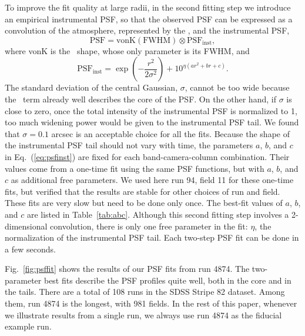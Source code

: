 To improve the fit quality at large radii, in the second fitting step we introduce an
empirical instrumental PSF, so that the observed PSF can be expressed as
a convolution of the atmosphere, represented by the \vk, and
the instrumental PSF,
\begin{equation}
        \textrm{PSF} = \textrm{vonK} (\textrm{FWHM}) \otimes \textrm{PSF}_{\textrm{inst}},
\end{equation} 
where vonK is the \vk~shape, whose only parameter is its FWHM, and
\begin{equation}
        \textrm{PSF}_{\textrm{inst}} = \exp(-\frac{r^2}{2\sigma^2}) + 10^{\eta(ar^2+br+c)}.
\label{eq:psfinst}
\end{equation} 
The standard deviation of the central Gaussian, $\sigma$, cannot be
too wide because the \vk~term already well describes the core of the PSF.
On the other hand, if $\sigma$ is close to zero, once the
total intensity of the instrumental PSF is normalized to 1, too much
widening power would be given to the instrumental PSF tail.
We found that $\sigma = 0.1$ arcsec is an acceptable choice for all the fits.
Because the shape of the instrumental PSF tail should not vary with
time, the parameters $a$, $b$, and $c$ in Eq.~(\ref{eq:psfinst}) are
fixed for each band-camera-column combination.
Their values come from a one-time fit using the same PSF functions,
but with $a$, $b$, and $c$ as additional free parameters.
We used here run 94, field 11 for these one-time fits, but verified that 
the results are stable for other choices of run and field. 
These fits are very slow but need to be done only once.
The best-fit values of $a$, $b$, and $c$ are listed in Table~\ref{tab:abc}.
Although this second fitting step involves a 2-dimensional convolution,
there is only one free parameter in the fit: $\eta$, the normalization of the
instrumental PSF tail. Each two-step PSF fit can be done in a few seconds.

Fig.~\ref{fig:psffit} shows the results of our PSF fits from run 4874. The two-parameter
best fits describe the PSF profiles quite well, both in the core and in the tails. There are 
a total of 108 runs in the SDSS Stripe 82 dataset. Among them, run 4874 is the longest, 
with 981 fields. In the rest of this paper, whenever we illustrate results from a single run, 
we always use run 4874 as the fiducial example run. 


